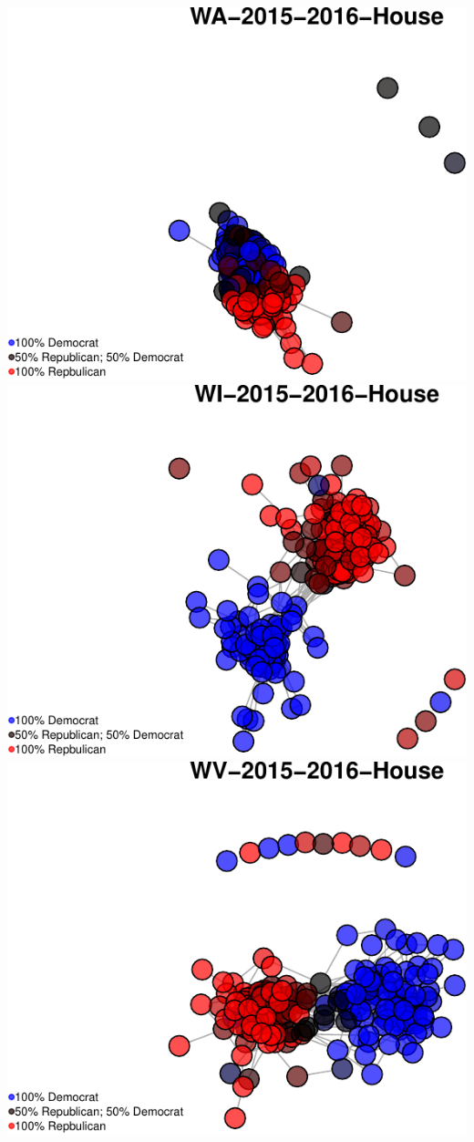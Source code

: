 \documentclass[]{article}
\begin{document}
\includegraphics{Final_Project_RMarkdown_Updated_files/figure-latex/unnamed-chunk-10-40.pdf}
\includegraphics{Final_Project_RMarkdown_Updated_files/figure-latex/unnamed-chunk-10-41.pdf}
\includegraphics{Final_Project_RMarkdown_Updated_files/figure-latex/unnamed-chunk-10-42.pdf}
\end{document}
